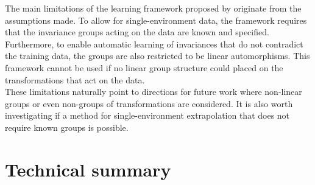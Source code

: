 The main limitations of the learning framework proposed by \textcite{Mouli:2021} originate from the assumptions made. To allow for single-environment data, the framework requires that the invariance groups acting on the data are known and specified. Furthermore, to enable automatic learning of invariances that do not contradict the training data, the groups are also restricted to be linear automorphisms. This framework cannot be used if no linear group structure could placed on the transformations that act on the data.
\\

These limitations naturally point to directions for future work where non-linear groups or even non-groups of transformations are considered. It is also worth investigating if a method for single-environment extrapolation that does not require known groups is possible.


\newpage


\section{Technical summary}